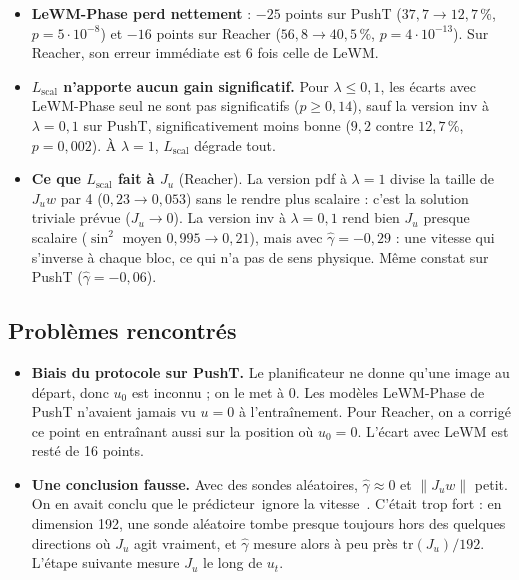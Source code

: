 \documentclass[11pt,a4paper]{article}
\newcommand{\og}{\guillemotleft\,\ignorespaces}
\newcommand{\fg}{\unskip\,\guillemotright}
\newcommand{\Lscal}{L_{\mathrm{scal}}}
\begin{document}
\begin{itemize}
  \item \textbf{LeWM-Phase perd nettement} : $-25$ points sur PushT ($37{,}7 \to 12{,}7\,\%$,
  $p = 5\cdot10^{-8}$) et $-16$ points sur Reacher ($56{,}8 \to 40{,}5\,\%$,
  $p = 4\cdot10^{-13}$). Sur Reacher, son erreur immédiate est 6 fois celle de LeWM.
  \item \textbf{$\Lscal$ n'apporte aucun gain significatif.} Pour $\lambda \le 0{,}1$, les
  écarts avec LeWM-Phase seul ne sont pas significatifs ($p \ge 0{,}14$), sauf la version inv à
  $\lambda = 0{,}1$ sur PushT, significativement moins bonne ($9{,}2$ contre $12{,}7\,\%$,
  $p = 0{,}002$). À $\lambda = 1$, $\Lscal$ dégrade tout.
  \item \textbf{Ce que $\Lscal$ fait à $J_u$} (Reacher). La version pdf à $\lambda=1$ divise
  la taille de $J_u w$ par 4 ($0{,}23 \to 0{,}053$) sans le rendre plus scalaire : c'est la
  solution triviale prévue ($J_u \to 0$). La version inv à $\lambda = 0{,}1$ rend bien $J_u$
  presque scalaire ($\sin^2$ moyen $0{,}995 \to 0{,}21$), mais avec $\hat\gamma = -0{,}29$ :
  une vitesse qui s'inverse à chaque bloc, ce qui n'a pas de sens physique. Même constat sur
  PushT ($\hat\gamma = -0{,}06$).
\end{itemize}

\subsection{Problèmes rencontrés}

\begin{itemize}
  \item \textbf{Biais du protocole sur PushT.} Le planificateur ne donne qu'une image au
  départ, donc $u_0$ est inconnu ; on le met à 0. Les modèles LeWM-Phase de PushT n'avaient jamais
  vu $u = 0$ à l'entraînement. Pour Reacher, on a corrigé ce point en entraînant aussi sur la
  position où $u_0 = 0$. L'écart avec LeWM est resté de 16 points.
  \item \textbf{Une conclusion fausse.} Avec des sondes aléatoires, $\hat\gamma \approx 0$
  et $\|J_u w\|$ petit. On en avait conclu que le prédicteur \og ignore la vitesse \fg{}. C'était
  trop fort : en dimension 192, une sonde aléatoire tombe presque toujours hors des quelques
  directions où $J_u$ agit vraiment, et $\hat\gamma$ mesure alors à peu près
  $\mathrm{tr}(J_u)/192$. L'étape suivante mesure $J_u$ le long de $u_t$.
\end{itemize}
\end{document}
